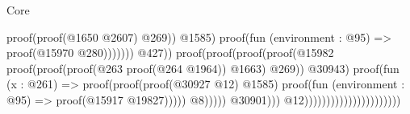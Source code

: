 \begin{lexlean}{Core}
\begin{coremodule}
                                                                                                            proof(proof(@1650
                                                                                                                  @2607)
                                                                                                                @269))
                                                                                                          @1585)
                                                                                                        proof(fun (environment : @95) =>
                                                                                                          proof(@15970
                                                                                                              @280)))))))
                                                                                          @427))
                                                                                    proof(proof(proof(proof(@15982
                                                                                              proof(proof(proof(@263
                                                                                                      proof(@264
                                                                                                          @1964))
                                                                                                    @1663)
                                                                                                  @269))
                                                                                            @30943)
                                                                                          proof(fun (x : @261) =>
                                                                                            proof(proof(proof(@30927
                                                                                                    @12)
                                                                                                  @1585)
                                                                                                proof(fun (environment : @95) =>
                                                                                                  proof(@15917
                                                                                                      @19827)))))
                                                                                        @8)))))
                                                                      @30901)))
                                                            @12))))))))))))))))))))))
\end{coremodule}
\end{lexlean}
